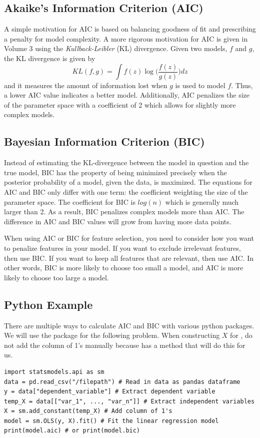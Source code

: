 \subsection*{Akaike's Information Criterion (AIC)}
A simple motivation for AIC is based on balancing goodness of fit and prescribing a penalty for model complexity.
A more rigorous motivation for AIC is given in Volume 3 using the \textit{Kullback-Leibler} (KL) divergence.
Given two models, $f$ and $g$, the KL divergence is given by \[ KL(f,g) = \int f(z)\log \bigg(\frac{f(z)}{g(z)} \bigg)dz \] and it measures the amount of information lost when $g$ is used to model $f$.
Thus, a lower AIC value indicates a better model.
Additionally, AIC penalizes the size of the parameter space with a coefficient of 2 which allows for slightly more complex models.


\subsection*{Bayesian Information Criterion (BIC)}
Instead of estimating the KL-divergence between the model in question and the true model, BIC has the property of being minimized precisely when the posterior probability of a model, given the data, is maximized.
The equations for AIC and BIC only differ with one term: the coefficient weighting the size of the parameter space. The coefficient for BIC is $log(n)$ which is generally much larger than 2.
As a result, BIC penalizes complex models more than AIC. The difference in AIC and BIC values will grow from having more data points.

When using AIC or BIC for feature selection, you need to consider how you want to penalize features in your model.
If you want to exclude irrelevant features, then use BIC. If you want to keep all features that are relevant, then use AIC.
In other words, BIC is more likely to choose too small a model, and AIC is more likely to choose too large a model.

\subsection*{Python Example}
There are multiple ways to calculate AIC and BIC with various python packages.
We will use the package  for the following problem.
When constructing $X$ for , do not add the column of 1's manually because  has a method that will do this for us.
\begin{lstlisting}
import statsmodels.api as sm
data = pd.read_csv("/filepath") # Read in data as pandas dataframe
y = data["dependent_variable"] # Extract dependent variable
temp_X = data[["var_1", ..., "var_n"]] # Extract independent variables
X = sm.add_constant(temp_X) # Add column of 1's
model = sm.OLS(y, X).fit() # Fit the linear regression model
print(model.aic) # or print(model.bic)
\end{lstlisting}

